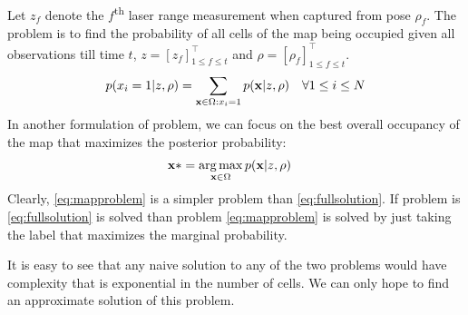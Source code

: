 \documentclass[letterpaper, 10 pt, conference]{ieeeconf} %
\DeclareMathOperator*{\argmax}{arg\,max}
\newcommand{\vect}[1]{\mathbf{#1}}
\begin{document}
Let $z_f$ denote the $f$\textsuperscript{th} laser range measurement when captured from pose $\rho_f$. 
The problem is to find the probability of all cells of the map being occupied given all observations till time $t$, $z = [z_f]^\top_{1 \le f \le t}$ and $\rho = [\rho_f]^\top_{1 \le f \le t}$.
\begin{align}
  p(x_i = 1 | z, \rho) &= \sum_{\map \in \Omega : x_i = 1} p(\map | z , \rho) & \forall 1 \le i \le N 
  \label{eq:fullsolution}
\end{align}
In another formulation of problem, we can focus on the best overall occupancy of the map that maximizes the posterior probability:
\begin{align}
  \vect{x}* &= \argmax_{\map \in \Omega } p(\map | z, \rho)
  \label{eq:mapproblem}
\end{align}
Clearly, \eqref{eq:mapproblem} is a simpler problem than \eqref{eq:fullsolution}. If problem is \eqref{eq:fullsolution} is solved than problem \eqref{eq:mapproblem} is solved by just taking the label that maximizes the marginal probability.

It is easy to see that any naive solution to any of the two problems would have complexity that is exponential in the number of cells. We can only hope to find an approximate solution of this problem.
\end{document}
